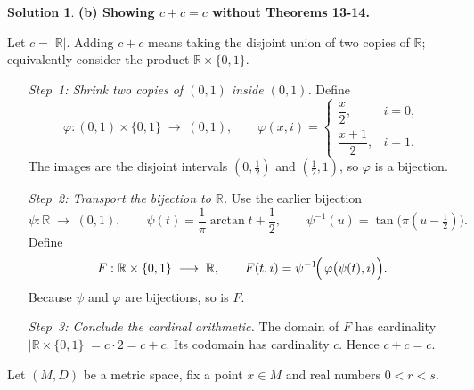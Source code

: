 \documentclass[12pt]{article}
\theoremstyle{definition} %
\newtheorem{solution}{Solution}
\theoremstyle{plain} %
\begin{document}
\begin{solution}
  \bigskip
  \textbf{(b)  Showing \(c+c=c\) without Theorems 13-14.}
  
  Let \(c=\bigl|\mathbb{R}\bigr|\).  Adding \(c+c\) means taking the
  disjoint union of two copies of \(\mathbb{R}\);
  equivalently consider the product \(\mathbb{R}\times\{0,1\}\).
  
  \begin{enumerate}
      \item[\emph{Step 1:  Shrink two copies of \((0,1)\) inside \((0,1)\).}]
            Define
            \[
                \varphi:(0,1)\times\{0,1\}\;\longrightarrow\;(0,1),\qquad
                \varphi(x,i)=
                \begin{cases}
                     \dfrac{x}{2},              & i=0,\\[6pt]
                     \dfrac{x+1}{2},            & i=1.
                \end{cases}
            \]
            The images are the disjoint intervals \((0,\tfrac12)\) and
            \((\tfrac12,1)\), so \(\varphi\) is a bijection.
  
      \item[\emph{Step 2:  Transport the bijection to \(\mathbb{R}\).}]
            Use the earlier bijection
            \[
                \psi:\mathbb{R}\;\longrightarrow\;(0,1),\qquad
                \psi(t)=\frac{1}{\pi}\arctan t+\frac12,
            \qquad
                \psi^{-1}(u)=\tan\!\bigl(\pi(u-\tfrac12)\bigr).
            \]
            Define
            \[
                F:\mathbb{R}\times\{0,1\}\;\longrightarrow\;\mathbb{R},
                \qquad
                F(t,i)=\psi^{-1}\!\Bigl(\,\varphi\bigl(\psi(t),i\bigr)\Bigr).
            \]
            Because \(\psi\) and \(\varphi\) are bijections, so is \(F\).
  
      \item[\emph{Step 3:  Conclude the cardinal arithmetic.}]
            The domain of \(F\) has cardinality
            \(\bigl|\mathbb{R}\times\{0,1\}\bigr|=c\cdot 2=c+c\).
            Its codomain has cardinality \(c\).
            Hence \(c+c=c\).
  \end{enumerate}
  \end{solution}
  
Let \((M,D)\) be a metric space, fix a point \(x\in M\) and real numbers
\(0<r<s\).
\end{document}
